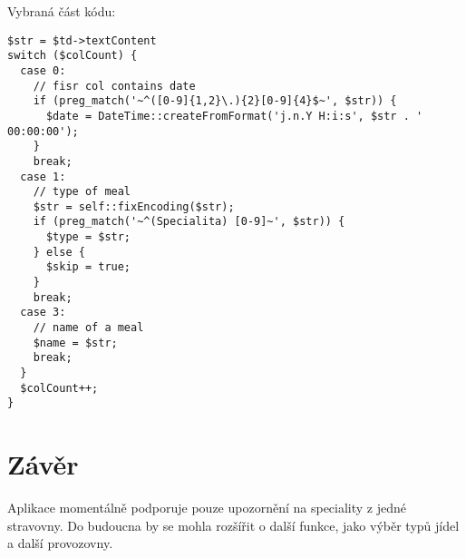 \documentclass[a4]{article}
\begin{document}
Vybraná část kódu:
\lstset{language=PHP}
\begin{lstlisting}
$str = $td->textContent
switch ($colCount) {
  case 0:
    // fisr col contains date
    if (preg_match('~^([0-9]{1,2}\.){2}[0-9]{4}$~', $str)) {
      $date = DateTime::createFromFormat('j.n.Y H:i:s', $str . ' 00:00:00');
    }
    break;
  case 1:
    // type of meal
    $str = self::fixEncoding($str);
    if (preg_match('~^(Specialita) [0-9]~', $str)) {
      $type = $str;
    } else {
      $skip = true;
    }
    break;
  case 3:
    // name of a meal
    $name = $str;
    break;
  }
  $colCount++;
}
\end{lstlisting}

\section{Závěr}
Aplikace momentálně podporuje pouze upozornění na speciality z jedné stravovny. Do budoucna by se mohla rozšířit o další funkce, jako výběr typů jídel a další provozovny.
\end{document}
